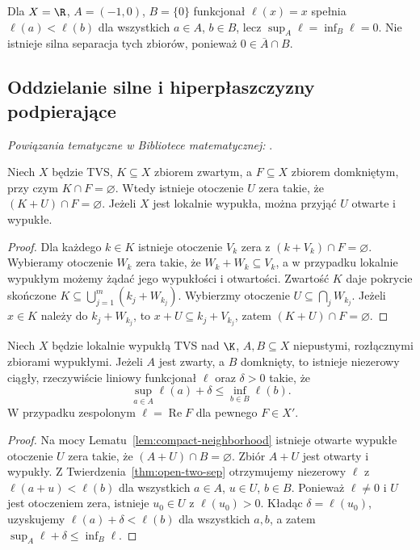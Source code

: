 \begin{przyklad}
Dla $X=\R$, $A=(-1,0)$, $B=\{0\}$ funkcjonał
$\ell(x)=x$ spełnia $\ell(a)<\ell(b)$ dla wszystkich
$a\in A$, $b\in B$, lecz $\sup_A\ell=\inf_B\ell=0$.
Nie istnieje silna separacja tych zbiorów, ponieważ
$0\in\overline A\cap B$.
\end{przyklad}

\subsection{Oddzielanie silne i hiperpłaszczyzny podpierające}

\noindent\emph{Powiązania tematyczne w Bibliotece matematycznej:} .


\begin{lemat}
\label{lem:compact-neighborhood}
Niech $X$ będzie TVS, $K\subseteq X$ zbiorem zwartym,
a $F\subseteq X$ zbiorem domkniętym, przy czym $K\cap F=\varnothing$.
Wtedy istnieje otoczenie $U$ zera takie, że
$(K+U)\cap F=\varnothing$. Jeżeli $X$ jest lokalnie wypukła,
można przyjąć $U$ otwarte i wypukłe.
\end{lemat}
\begin{proof}
Dla każdego $k\in K$ istnieje otoczenie $V_k$ zera
z $(k+V_k)\cap F=\varnothing$. Wybieramy otoczenie
$W_k$ zera takie, że $W_k+W_k\subseteq V_k$,
a w przypadku lokalnie wypukłym możemy żądać
jego wypukłości i otwartości. Zwartość $K$ daje
pokrycie skończone $K\subseteq\bigcup_{j=1}^m(k_j+W_{k_j})$.
Wybierzmy otoczenie $U\subseteq\bigcap_j W_{k_j}$.
Jeżeli $x\in K$ należy do $k_j+W_{k_j}$, to
$x+U\subseteq k_j+V_{k_j}$, zatem $(K+U)\cap F=\varnothing$.
\end{proof}

\begin{twierdzenie}
\label{thm:strong-separation}
Niech $X$ będzie lokalnie wypukłą TVS nad $\K$,
$A,B\subseteq X$ niepustymi, rozłącznymi zbiorami wypukłymi.
Jeżeli $A$ jest zwarty, a $B$ domknięty, to istnieje
niezerowy ciągły, rzeczywiście liniowy funkcjonał $\ell$
oraz $\delta>0$ takie, że
\[
\sup_{a\in A}\ell(a)+\delta\le\inf_{b\in B}\ell(b).
\]
W przypadku zespolonym $\ell=\operatorname{Re}F$ dla pewnego $F\in X'$.
\end{twierdzenie}
\begin{proof}
Na mocy Lematu~\ref{lem:compact-neighborhood} istnieje
otwarte wypukłe otoczenie $U$ zera takie, że
$(A+U)\cap B=\varnothing$. Zbiór $A+U$ jest otwarty
i wypukły. Z Twierdzenia~\ref{thm:open-two-sep}
otrzymujemy niezerowy $\ell$ z
$\ell(a+u)<\ell(b)$ dla wszystkich
$a\in A$, $u\in U$, $b\in B$. Ponieważ $\ell\ne0$
i $U$ jest otoczeniem zera, istnieje $u_0\in U$
z $\ell(u_0)>0$. Kładąc $\delta=\ell(u_0)$, uzyskujemy
$\ell(a)+\delta<\ell(b)$ dla wszystkich $a,b$,
a zatem $\sup_A\ell+\delta\le\inf_B\ell$.
\end{proof}

